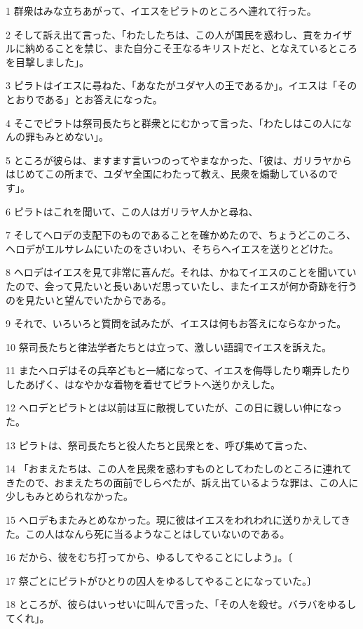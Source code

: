 \par 1 群衆はみな立ちあがって、イエスをピラトのところへ連れて行った。
\par 2 そして訴え出て言った、「わたしたちは、この人が国民を惑わし、貢をカイザルに納めることを禁じ、また自分こそ王なるキリストだと、となえているところを目撃しました」。
\par 3 ピラトはイエスに尋ねた、「あなたがユダヤ人の王であるか」。イエスは「そのとおりである」とお答えになった。
\par 4 そこでピラトは祭司長たちと群衆とにむかって言った、「わたしはこの人になんの罪もみとめない」。
\par 5 ところが彼らは、ますます言いつのってやまなかった、「彼は、ガリラヤからはじめてこの所まで、ユダヤ全国にわたって教え、民衆を煽動しているのです」。
\par 6 ピラトはこれを聞いて、この人はガリラヤ人かと尋ね、
\par 7 そしてヘロデの支配下のものであることを確かめたので、ちょうどこのころ、ヘロデがエルサレムにいたのをさいわい、そちらへイエスを送りとどけた。
\par 8 ヘロデはイエスを見て非常に喜んだ。それは、かねてイエスのことを聞いていたので、会って見たいと長いあいだ思っていたし、またイエスが何か奇跡を行うのを見たいと望んでいたからである。
\par 9 それで、いろいろと質問を試みたが、イエスは何もお答えにならなかった。
\par 10 祭司長たちと律法学者たちとは立って、激しい語調でイエスを訴えた。
\par 11 またヘロデはその兵卒どもと一緒になって、イエスを侮辱したり嘲弄したりしたあげく、はなやかな着物を着せてピラトへ送りかえした。
\par 12 ヘロデとピラトとは以前は互に敵視していたが、この日に親しい仲になった。
\par 13 ピラトは、祭司長たちと役人たちと民衆とを、呼び集めて言った、
\par 14 「おまえたちは、この人を民衆を惑わすものとしてわたしのところに連れてきたので、おまえたちの面前でしらべたが、訴え出ているような罪は、この人に少しもみとめられなかった。
\par 15 ヘロデもまたみとめなかった。現に彼はイエスをわれわれに送りかえしてきた。この人はなんら死に当るようなことはしていないのである。
\par 16 だから、彼をむち打ってから、ゆるしてやることにしよう」。〔
\par 17 祭ごとにピラトがひとりの囚人をゆるしてやることになっていた。〕
\par 18 ところが、彼らはいっせいに叫んで言った、「その人を殺せ。バラバをゆるしてくれ」。
